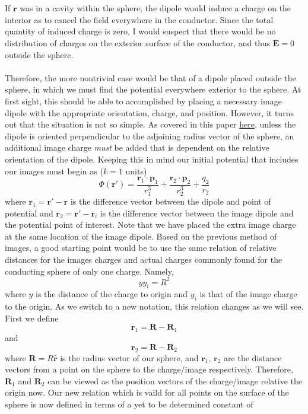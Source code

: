 \documentclass[11pt,letterpaper]{article}
\newcommand{\vect}[1]{\mathbf{#1}}
\newcommand{\vecth}[1]{\hat{\mathbf{#1}}}
\begin{document}
\begin{enumerate}
\\ \\If $\vect r$ was in a cavity within the sphere, the dipole would induce a charge on the interior as to cancel the field everywhere in the conductor. Since the total quantity of induced charge is zero, I would suspect that there would be no distribution of charges on the exterior surface of the conductor, and thus $\vect E = 0$ outside the sphere.
\\ \\ Therefore, the more nontrivial case would be that of a dipole placed outside the sphere, in which we must find the potential everywhere exterior to the sphere. At first sight, this should be able to accomplished by placing a necessary image dipole with the appropriate orientation, charge, and position. However, it turns out that the situation is not so simple. As covered in this paper \href{http://arxiv.org/pdf/physics/0405122.pdf}{here}, unless the dipole is oriented perpendicular to the adjoining radius vector of the sphere, an additional image charge \emph{must} be added that is dependent on the relative orientation of the dipole. Keeping this in mind our initial potential that includes our images must begin as ($k=1$ units)
$$\Phi(\vect r') = \frac{\vect r_1\cdot\vect p_1}{r_1^3}+\frac{\vect r_2\cdot\vect p_2}{r_2^3}+\frac{q_2}{r_2}$$
where $\vect r_1 = \vect r'-\vect r$ is the difference vector between the dipole and point of potential and $\vect r_2 = \vect r'-\vect r_i$ is the difference vector between the image dipole and the potential point of interest. Note that we have placed the extra image charge at the same location of the image dipole. Based on the previous method of images, a good starting point would be to use the same relation of relative distances for the images charges and actual charges commonly found for the conducting sphere of only one charge. Namely,
$$yy_i = R^2$$
where $y$ is the distance of the charge to origin and $y_i$ is that of the image charge to the origin. As we switch to a new notation, this relation changes as we will see. First we define
$$\vect r_1 = \vect R-\vect R_1$$
and
$$\vect r_2 = \vect R-\vect R_2$$
where $\vect R = R\vecth r$ is the radius vector of our sphere, and $\vect r_1$, $\vect r_2$ are the distance vectors from a point on the sphere to the charge/image respectively. Therefore, $\vect R_1$ and $\vect R_2$ can be viewed as the position vectors of the charge/image relative the origin now. Our new relation which is vaild for all points on the surface of the sphere is now defined in terms of a yet to be determined constant of 

\end{enumerate}
\end{document}
